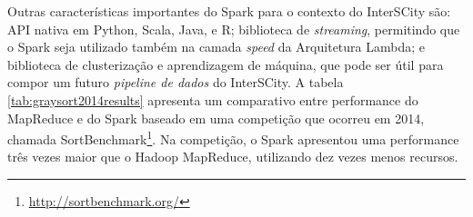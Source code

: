 Outras características importantes do Spark para o contexto do
InterSCity são: API nativa em Python, Scala, Java, e R; biblioteca de
\textit{streaming}, permitindo que o Spark seja utilizado também na camada
\textit{speed} da Arquitetura Lambda; e biblioteca de clusterização e
aprendizagem de máquina, que pode ser útil para compor um futuro \textit{pipeline
de dados} do InterSCity. A tabela \ref{tab:graysort2014results} apresenta
um comparativo entre performance do MapReduce e do Spark baseado em uma
competição que ocorreu em 2014, chamada
SortBenchmark\footnote{\url{http://sortbenchmark.org/}}. Na competição, o Spark
apresentou uma performance três vezes maior que o Hadoop MapReduce, utilizando
dez vezes menos recursos.


\begin{table}[!htbp]
    \centering
    \caption[Resultados da Sort Benchmark 2014, categoria GraySort]{Resultados da Sort Benchmark 2014, categoria GraySort. Fonte: Databricks, 2014\footnotemark.}
    \label{tab:graysort2014results}
\end{table}

